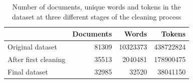 \begin{table}[tb]
\caption[Dataset size]{Number of documents, unique words and tokens in the dataset at three different stages of the cleaning process}
\label{tab:dataset}
\begin{tabular}{l|rrr}
\toprule
 & Documents & Words & Tokens \\
\midrule
Original dataset & 81309 & 10323373 & 438722824 \\
After first cleaning & 35513 & 2040481 & 178900475 \\
Final dataset & 32985 & 32520 & 38041150 \\
\bottomrule
\end{tabular}
\end{table}
